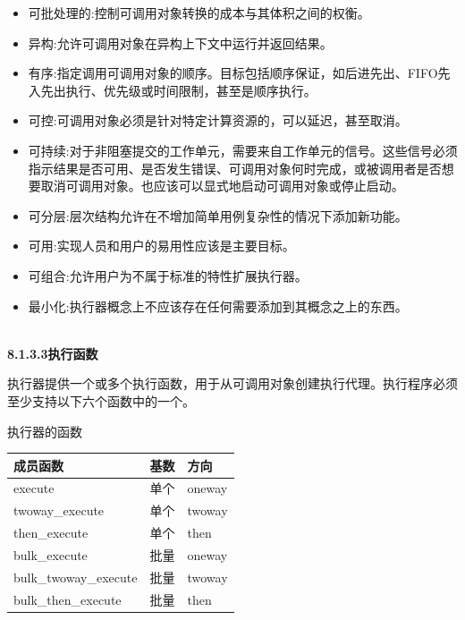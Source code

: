 \begin{itemize}
\item 
可批处理的:控制可调用对象转换的成本与其体积之间的权衡。

\item 
异构:允许可调用对象在异构上下文中运行并返回结果。

\item 
有序:指定调用可调用对象的顺序。目标包括顺序保证，如后进先出、FIFO先入先出执行、优先级或时间限制，甚至是顺序执行。

\item 
可控:可调用对象必须是针对特定计算资源的，可以延迟，甚至取消。

\item 
可持续:对于非阻塞提交的工作单元，需要来自工作单元的信号。这些信号必须指示结果是否可用、是否发生错误、可调用对象何时完成，或被调用者是否想要取消可调用对象。也应该可以显式地启动可调用对象或停止启动。

\item 
可分层:层次结构允许在不增加简单用例复杂性的情况下添加新功能。

\item 
可用:实现人员和用户的易用性应该是主要目标。
 
\item 
可组合:允许用户为不属于标准的特性扩展执行器。

\item 
最小化:执行器概念上不应该存在任何需要添加到其概念之上的东西。
\end{itemize}

\hspace*{\fill} \\ %
\noindent
\textbf{8.1.3.3\hspace{0.2cm}执行函数}

执行器提供一个或多个执行函数，用于从可调用对象创建执行代理。执行程序必须至少支持以下六个函数中的一个。

\begin{center}
执行器的函数
\end{center}

\begin{table}[H]
\centering
\begin{tabular}{lll}
\textbf{成员函数} & \textbf{基数} & \textbf{方向} \\ \hline
execute                  & 单个               & oneway             \\
twoway\_execute          & 单个               & twoway             \\
then\_execute            & 单个               & then               \\
bulk\_execute            & 批量                 & oneway             \\
bulk\_twoway\_execute    & 批量                 & twoway             \\
bulk\_then\_execute      & 批量                 & then              
\end{tabular}
\end{table}

